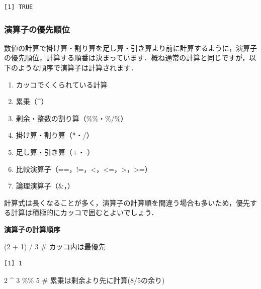 \documentclass[
  letterpaper,
  DIV=11,
  numbers=noendperiod]{scrreprt}
\newenvironment{Shaded}{\begin{snugshade}}{\end{snugshade}}
\newcommand{\CommentTok}[1]{\textcolor[rgb]{0.37,0.37,0.37}{#1}}
\newcommand{\DecValTok}[1]{\textcolor[rgb]{0.68,0.00,0.00}{#1}}
\newcommand{\NormalTok}[1]{\textcolor[rgb]{0.00,0.23,0.31}{#1}}
\newcommand{\SpecialCharTok}[1]{\textcolor[rgb]{0.37,0.37,0.37}{#1}}
\providecommand{\tightlist}{%
  \setlength{\itemsep}{0pt}\setlength{\parskip}{0pt}}\usepackage{longtable,booktabs,array}
\begin{document}
\begin{verbatim}
[1] TRUE
\end{verbatim}

\hypertarget{ux6f14ux7b97ux5b50ux306eux512aux5148ux9806ux4f4d}{%
\subsubsection{演算子の優先順位}\label{ux6f14ux7b97ux5b50ux306eux512aux5148ux9806ux4f4d}}

数値の計算で掛け算・割り算を足し算・引き算より前に計算するように，演算子の優先順位，計算する順番は決まっています．概ね通常の計算と同じですが，以下のような順序で演算子は計算されます．

\begin{enumerate}
\def\labelenumi{\arabic{enumi}.}
\tightlist
\item
  カッコでくくられている計算
\item
  累乗（\^{}）
\item
  剰余・整数の割り算（\%\%・\%/\%）
\item
  掛け算・割り算（*・/）
\item
  足し算・引き算（+・-）
\item
  比較演算子（==，!=，\textless，\textless=，\textgreater，\textgreater=）
\item
  論理演算子（\&，\textbar）
\end{enumerate}

計算式は長くなることが多く，演算子の計算順を間違う場合も多いため，優先する計算は積極的にカッコで囲むとよいでしょう．

\textbf{演算子の計算順序}

\begin{Shaded}
\begin{Highlighting}[]
\NormalTok{(}\DecValTok{2} \SpecialCharTok{+} \DecValTok{1}\NormalTok{) }\SpecialCharTok{/} \DecValTok{3} \CommentTok{\# カッコ内は最優先}
\end{Highlighting}
\end{Shaded}

\begin{verbatim}
[1] 1
\end{verbatim}

\begin{Shaded}
\begin{Highlighting}[]
\DecValTok{2} \SpecialCharTok{\^{}} \DecValTok{3} \SpecialCharTok{\%\%} \DecValTok{5} \CommentTok{\# 累乗は剰余より先に計算(8/5の余り)}
\end{Highlighting}
\end{Shaded}
\end{document}
